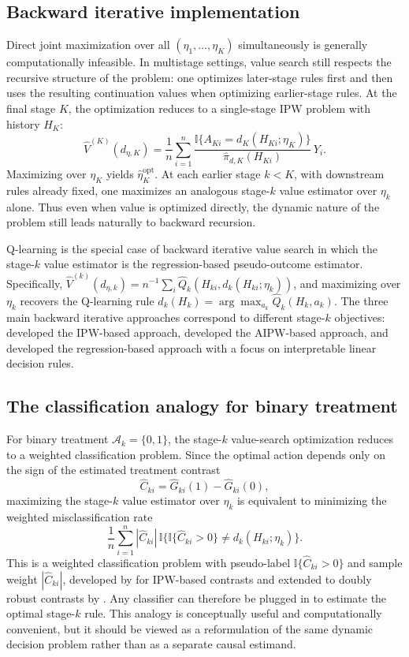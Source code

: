 \documentclass[master.tex]{subfiles}
\begin{document}
\subsection{Backward iterative implementation}

Direct joint maximization over all $(\eta_1,\ldots,\eta_K)$ simultaneously is generally computationally infeasible. In multistage settings, value search still respects the recursive structure of the problem: one optimizes later-stage rules first and then uses the resulting continuation values when optimizing earlier-stage rules. At the final stage $K$, the optimization reduces to a single-stage IPW problem with history $H_K$:
\[
\widehat{V}^{(K)}(d_{\eta,K})
= \frac{1}{n}\sum_{i=1}^n
\frac{\mathbb{I}\{A_{Ki} = d_K(H_{Ki};\eta_K)\}}{\hat\pi_{d,K}(H_{Ki})}\,Y_i.
\]
Maximizing over $\eta_K$ yields $\hat\eta_K^{\mathrm{opt}}$. At each earlier stage $k < K$, with downstream rules already fixed, one maximizes an analogous stage-$k$ value estimator over $\eta_k$ alone. Thus even when value is optimized directly, the dynamic nature of the problem still leads naturally to backward recursion.

\begin{remark}
Q-learning is the special case of backward iterative value search in which the stage-$k$ value estimator is the regression-based pseudo-outcome estimator.  Specifically, $\hat{V}^{(k)}(d_{\eta,k}) = n^{-1}\sum_i \hat{Q}_k(H_{ki}, d_k(H_{ki};\eta_k))$, and maximizing over $\eta_k$ recovers the Q-learning rule $\hat{d}_k(H_k) = \arg\max_{a_k} \hat{Q}_k(H_k, a_k)$.  The three main backward iterative approaches correspond to different stage-$k$ objectives: \citet{zhao2015b} developed the IPW-based approach, \citet{zhang2018} developed the AIPW-based approach, and \citet{zhang2018b} developed the regression-based approach with a focus on interpretable linear decision rules.
\end{remark}

\subsection{The classification analogy for binary treatment}
\label{w15:subsec:classification}

For binary treatment $\mathcal{A}_k = \{0,1\}$, the stage-$k$ value-search optimization reduces to a weighted classification problem. Since the optimal action depends only on the sign of the estimated treatment contrast
\[
\hat{C}_{ki} = \widehat{G}_{ki}(1) - \widehat{G}_{ki}(0),
\]
maximizing the stage-$k$ value estimator over $\eta_k$ is equivalent to minimizing the weighted misclassification rate
\[
\frac{1}{n}\sum_{i=1}^n
|\hat{C}_{ki}|\,
\mathbb{I}\bigl\{\mathbb{I}\{\hat{C}_{ki}>0\} \neq d_k(H_{ki};\eta_k)\bigr\}.
\]
This is a weighted classification problem with pseudo-label $\mathbb{I}\{\hat{C}_{ki}>0\}$ and sample weight $|\hat{C}_{ki}|$, developed by \citet{zhao2015b} for IPW-based contrasts and extended to doubly robust contrasts by \citet{zhang2018}. Any classifier can therefore be plugged in to estimate the optimal stage-$k$ rule. This analogy is conceptually useful and computationally convenient, but it should be viewed as a reformulation of the same dynamic decision problem rather than as a separate causal estimand.
\end{document}
